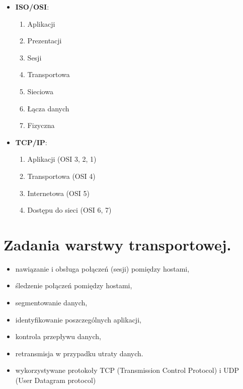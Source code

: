 \documentclass[12pt,a4paper]{article}
\begin{document}
	\begin{multicols}{2}
		\begin{itemize}
			\item \textbf{ISO/OSI}:
			\begin{enumerate}
				\item Aplikacji
				\item Prezentacji
				\item Sesji
				\item Transportowa
				\item Sieciowa
				\item Łącza danych
				\item Fizyczna	
			\end{enumerate}
		
			\columnbreak
			
			\item \textbf{TCP/IP}:
			\begin{enumerate}
				\item Aplikacji (OSI 3, 2, 1)
				\item Transportowa (OSI 4)
				\item Internetowa (OSI 5)
				\item Dostępu do sieci (OSI 6, 7)
			\end{enumerate}
		
			\vfill\null
		\end{itemize}
	\end{multicols}
	
	\section{Zadania warstwy transportowej.}
	\begin{itemize}
		\item nawiązanie i obsługa połączeń (sesji) pomiędzy hostami,
		\item śledzenie połączeń pomiędzy hostami,
		\item segmentowanie danych,
		\item identyfikowanie poszczególnych aplikacji,
		\item kontrola przepływu danych,
		\item retransmisja w przypadku utraty danych.
		\item wykorzystywane protokoły TCP (Transmission Control Protocol) i UDP (User Datagram protocol)
	\end{itemize}
\end{document}
